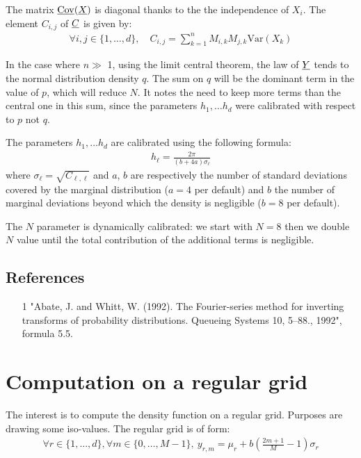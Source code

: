 The matrix ${\underline{\mathrm{Cov}}}({\underline{X}})$ is diagonal thanks to the the independence of $X_i$.
The element $C_{i,j}$ of ${\underline{C}}$ is given by:
\begin{align}
\forall i,j\in\{1,\hdots,d\},\quad C_{i,j}=\sum_{k=1}^nM_{i,k}M_{j,k}\mathrm{Var}(X_k)
\end{align}

In the case where $n \gg $ 1, using the limit central theorem, the law of ${\underline{Y}} $ tends to the normal distribution density $q$.
The sum on $q$ will be the dominant term in the value of $p$, which will reduce $N$.
It notes the need to keep more terms than the central one in this sum, since the parameters $ h_1, \dots  h_d$ were calibrated
with respect to $p$ not $q$.

The parameters $h_1, \dots  h_d$ are calibrated using the following formula:
\begin{align}
  h_\ell = \frac{2\pi}{(b+4a)\sigma_\ell}
\end{align}
where $\sigma_\ell=\sqrt{C_{\ell,\ell}}$ and $a$, $b$ are respectively the number of standard deviations covered by the marginal distribution
($a=4$ per default) and $b$ the number of marginal deviations beyond which the density is negligible ($b=8$ per default).

The $N$ parameter is dynamically calibrated: we start with $N=8$ then we double $N$ value until the total contribution of the additional terms is negligible.

\subsection{References}\label{ref}
\begin{itemize}
  \item[1] "Abate, J. and Whitt, W. (1992). The Fourier-series method for inverting transforms of probability distributions. Queueing Systems 10, 5--88., 1992",
        formula 5.5.
\end{itemize}

\section{Computation on a regular grid}
The interest is to compute the density function on a regular grid. Purposes are drawing some iso-values.
The regular grid is of form:
\begin{align}
  \forall r\in\{1,\hdots,d\},\forall m\in\{0,\hdots,M-1\},\:y_{r,m}=\mu_r+b\left(\frac{2m+1}{M} - 1\right)\sigma_r
\end{align}

